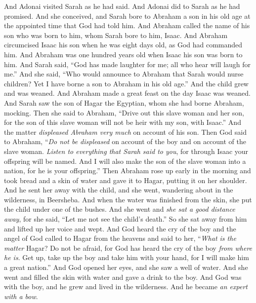 \begin{biblechapter} %
 And Adonai visited Sarah as he had said. And Adonai did to Sarah as he had promised.
\verse And she conceived, and Sarah bore to Abraham a son in his old age at the appointed time that God had told him.
\verse And Abraham called the name of his son who was born to him, whom Sarah bore to him, Isaac.
\verse And Abraham circumcised Isaac his son when he was eight days old, as God had commanded him.
\verse And Abraham was one hundred years old when Isaac his son was born to him.
\verse And Sarah said, “God has made laughter for me; all who hear will laugh for me.”
\verse And she said, “Who would announce to Abraham that Sarah would nurse children? Yet I have borne a son to Abraham in his old age.”
 And the child grew and was weaned. And Abraham made a great feast on the day Isaac was weaned.
\verse And Sarah saw the son of Hagar the Egyptian, whom she had borne Abraham, mocking.
\verse Then she said to Abraham, “Drive out this slave woman and her son, for the son of this slave woman will not be heir with my son, with Isaac.”
\verse And the matter \textit{displeased Abraham very much} on account of his son.
\verse Then God said to Abraham, “\textit{Do not be displeased} on account of the boy and on account of the slave woman. \textit{Listen to everything that Sarah said to you}, for through Isaac your offspring will be named.
\verse And I will also make the son of the slave woman into a nation, for he is your offspring.”
\verse Then Abraham rose up early in the morning and took bread and a skin of water and gave it to Hagar, putting it on her shoulder. And he sent her away with the child, and she went, wandering about in the wilderness, in Beersheba.
\verse And when the water was finished from the skin, she put the child under one of the bushes.
\verse And she went and \textit{she sat a good distance away}, for she said, “Let me not see the child’s death.” So she sat away from him and lifted up her voice and wept.
\verse And God heard the cry of the boy and the angel of God called to Hagar from the heavens and said to her, “\textit{What is the matter} Hagar? Do not be afraid, for God has heard the cry of the boy \textit{from where he is}.
\verse Get up, take up the boy and take him with your hand, for I will make him a great nation.”
\verse And God opened her eyes, and she saw a well of water. And she went and filled the skin with water and gave a drink to the boy.
\verse And God was with the boy, and he grew and lived in the wilderness. And he became \textit{an expert with a bow}.

\end{biblechapter}
